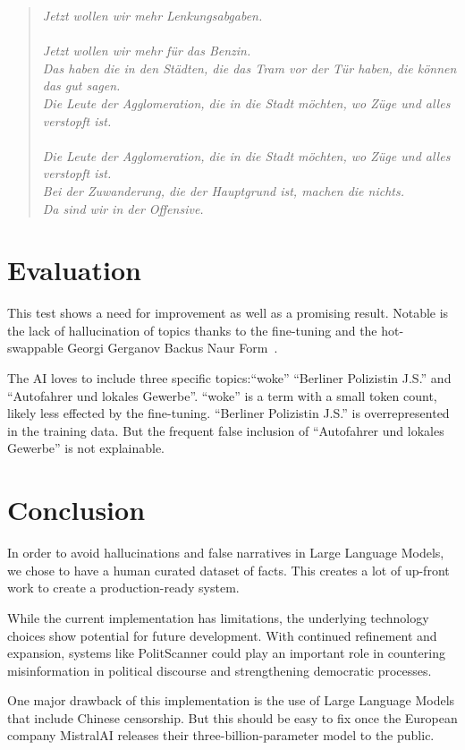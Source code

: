 \documentclass[a4paper,11pt]{report}
\newenvironment{itquote}
	{\begin{quote}\itshape}
	{\end{quote}\ignorespacesafterend}
\begin{document}
\begin{itquote}
				Jetzt wollen wir mehr Lenkungsabgaben.\\
				\\
				Jetzt wollen wir mehr für das Benzin.\\
				Das haben die in den Städten, die das Tram vor der Tür haben, die können das gut sagen.\\
				Die Leute der Agglomeration, die in die Stadt möchten, wo Züge und alles verstopft ist.\\
				\\
				Die Leute der Agglomeration, die in die Stadt möchten, wo Züge und alles verstopft ist.\\
				Bei der Zuwanderung, die der Hauptgrund ist, machen die nichts.\\
				Da sind wir in der Offensive.
			\end{itquote}

	    \section{Evaluation}\label{sec:evaluation}
			This test shows a need for improvement as well as a promising result.
			Notable is the lack of hallucination of topics thanks to the fine-tuning and the hot-swappable Georgi Gerganov Backus Naur Form~\cite{gbnf}.

			The AI loves to include three specific topics:\enquote{woke} \enquote{Berliner Polizistin J.S.} and \enquote{Autofahrer und lokales Gewerbe}.
			\enquote{woke} is a term with a small token count, likely less effected by the fine-tuning.
			\enquote{Berliner Polizistin J.S.} is overrepresented in the training data.
	        But the frequent false inclusion of \enquote{Autofahrer und lokales Gewerbe} is not explainable.

		\section{Conclusion}\label{sec:conclusion}
			In order to avoid hallucinations and false narratives in Large Language Models, we chose to have a human curated dataset of facts.
	        This creates a lot of up-front work to create a production-ready system.

		    While the current implementation has limitations, the underlying technology choices show potential for future development.
			With continued refinement and expansion, systems like PolitScanner could play an important role in countering misinformation in political discourse and strengthening democratic processes.

	        One major drawback of this implementation is the use of Large Language Models that include Chinese censorship.
	        But this should be easy to fix once the European company MistralAI releases their three-billion-parameter model to the public.
	        
	\printbibliography[heading=bibintoc]
\end{document}
